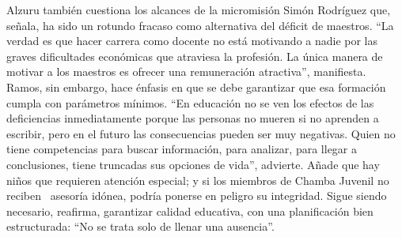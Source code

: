 \documentclass{article}%
\begin{document}
\newline%
%
Alzuru también cuestiona los alcances de la micromisión Simón Rodríguez que, señala, ha sido un rotundo fracaso como alternativa del déficit de maestros. “La verdad es que hacer carrera como docente no está motivando a nadie por las graves dificultades económicas que atraviesa la profesión. La única manera de motivar a los maestros es ofrecer una remuneración atractiva”, manifiesta.%
\newline%
%
Ramos, sin embargo, hace énfasis en que se debe garantizar que esa formación cumpla con parámetros mínimos. “En educación no se ven los efectos de las deficiencias inmediatamente porque las personas no mueren si no aprenden a escribir, pero en el futuro las consecuencias pueden ser muy negativas. Quien no tiene competencias para buscar información, para analizar, para llegar a conclusiones, tiene truncadas sus opciones de vida”, advierte.%
\newline%
%
Añade que hay niños que requieren atención especial; y si los miembros de Chamba Juvenil no reciben ~asesoría idónea, podría ponerse en peligro su integridad. Sigue siendo necesario, reafirma, garantizar calidad educativa, con una planificación bien estructurada: “No se trata solo de llenar una ausencia”.%
\newline%
%
\end{document}
